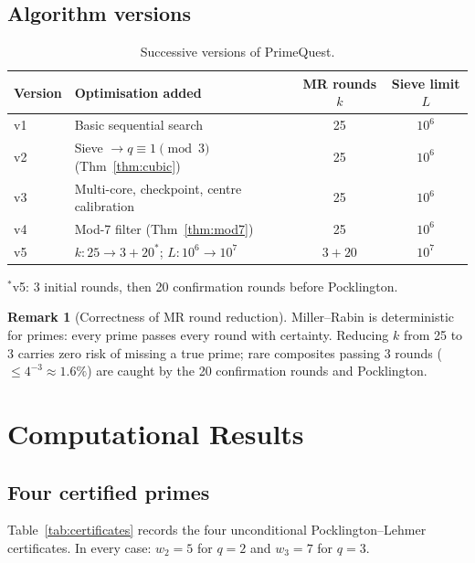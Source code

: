 \documentclass[11pt,a4paper]{article}
\theoremstyle{plain}
\theoremstyle{definition}
\newtheorem{remark}[theorem]{Remark}
\begin{document}
\subsection{Algorithm versions}

\begin{table}[ht]
\centering
\caption{Successive versions of PrimeQuest.}
\label{tab:versions}
\begin{tabular}{l l c c}
\toprule
Version & Optimisation added & MR rounds $k$ & Sieve limit $L$ \\
\midrule
v1 & Basic sequential search                       & 25       & $10^6$ \\
v2 & Sieve $\to q \equiv 1 \pmod{3}$ (Thm~\ref{thm:cubic}) & 25       & $10^6$ \\
v3 & Multi-core, checkpoint, centre calibration    & 25       & $10^6$ \\
v4 & Mod-7 filter (Thm~\ref{thm:mod7})             & 25       & $10^6$ \\
v5 & $k: 25 \to 3 + 20^*$; $L: 10^6 \to 10^7$      & $3 + 20$ & $10^7$ \\
\bottomrule
\end{tabular}

\smallskip
\footnotesize
$^*$v5: 3 initial rounds, then 20 confirmation rounds before Pocklington.
\end{table}

\begin{remark}[Correctness of MR round reduction]\label{rem:mr-rounds}
Miller--Rabin is deterministic for primes: every prime passes every round
with certainty. Reducing $k$ from 25 to 3 carries zero risk of missing a true
prime; rare composites passing 3 rounds ($\le 4^{-3} \approx 1.6\%$) are
caught by the 20 confirmation rounds and Pocklington.
\end{remark}

\section{Computational Results}
\label{sec:results}

\subsection{Four certified primes}

\begin{computational}
Table~\ref{tab:certificates} records the four unconditional
Pocklington--Lehmer certificates. In every case:
$w_2 = 5$ for $q = 2$ and $w_3 = 7$ for $q = 3$.
\end{computational}
\end{document}
